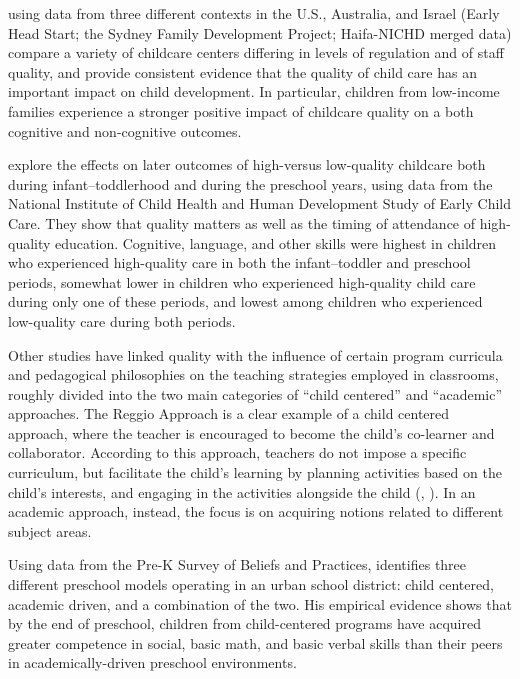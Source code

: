 \documentclass[12pt]{article}
\begin{document}
\cite{Love2003} using data from three different contexts in the U.S., Australia, and Israel (Early Head Start; the Sydney Family Development Project; Haifa-NICHD merged data) compare a variety of childcare centers differing in levels of regulation and of staff quality, and provide consistent evidence that the quality of child care has an important impact on child development. In particular, children from low-income families experience a stronger positive impact of childcare quality on a both cognitive and non-cognitive outcomes.

\cite{Li2013} explore the effects on later outcomes of high-versus low-quality childcare both during infant--toddlerhood and during the preschool years, using data from the National Institute of Child Health and Human Development Study of Early Child Care. They show that quality matters as well as the timing of attendance of high-quality education. Cognitive, language, and other skills were highest in children who experienced high-quality care in both the infant--toddler and preschool periods, somewhat lower in children who experienced high-quality child care during only one of these periods, and lowest among children who experienced low-quality care during both periods.

Other studies have linked quality with the influence of certain program curricula and pedagogical philosophies on the teaching strategies employed in classrooms, roughly divided into the two main categories of ``child centered'' and ``academic'' approaches. The Reggio Approach is a clear example of a child centered approach, where the teacher is encouraged to become the child's co-learner and collaborator. According to this approach, teachers do not impose a specific curriculum, but facilitate the child's learning by planning activities based on the child's interests, and engaging in the activities alongside the child (\cite{Malaguzzi1993}, \cite{Hewett2001}). In an academic approach, instead, the focus is on acquiring notions related to different subject areas.

Using data from the Pre-K Survey of Beliefs and Practices, \cite{Marcon1999} identifies three different preschool models operating in an urban school district: child centered, academic driven, and a combination of the two. His empirical evidence shows that by the end of preschool, children from child-centered programs have acquired greater competence in social, basic math, and basic verbal skills than their peers in academically-driven preschool environments.
\end{document}
